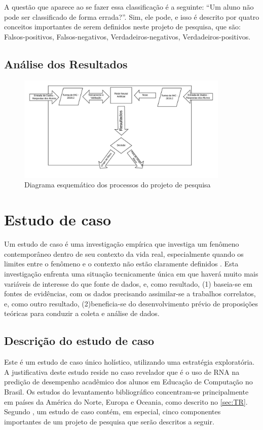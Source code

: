 \documentclass[
	12pt,				%
	openright,			%
	oneside,
	a4paper,			%
	english,			%
	french,				%
	spanish,			%
	brazil,				%
	]{abntex2}
\begin{document}
A questão que aparece ao se fazer essa classificação é a seguinte: ``Um aluno não pode ser classificado de forma errada?''. Sim, ele pode, e isso é descrito por quatro conceitos importantes de serem definidos neste projeto de pesquisa, que são: Falsos-positivos, Falsos-negativos, Verdadeiros-negativos, Verdadeiros-positivos. 

\subsection{Análise dos Resultados}

\begin{figure}
    \centering
    \includegraphics[width=0.9\textwidth]{Modelo_Projeto_Pesquisa_UFG_REJ_BCC/Diagrama.jpeg}
    \caption{Diagrama esquemático dos processos do projeto de pesquisa}
    \label{fig:my_label}
\end{figure}


\section{Estudo de caso}
\label{sec:estudo}
Um estudo de caso é uma investigação empírica que investiga um fenômeno contemporâneo dentro de seu contexto da vida real, especialmente quando os limites entre o fenômeno e o contexto não estão claramente definidos \cite{yin2001planejamento}. Esta investigação enfrenta uma situação tecnicamente única em que haverá muito mais variáveis de interesse do que fonte de dados, e, como resultado, (1) baseia-se em fontes de evidências, com os dados precisando assimilar-se a trabalhos correlatos, e, como outro resultado, (2)beneficia-se do desenvolvimento prévio de proposições teóricas para conduzir a coleta e análise de dados.

\subsection{Descrição do estudo de caso}
Este é um estudo de caso único holístico, utilizando uma estratégia exploratória. A justiﬁcativa deste estudo reside no caso revelador que é o uso de RNA na predição de desempenho acadêmico dos alunos em Educação de Computação no Brasil. Os estudos do levantamento bibliográfico concentram-se principalmente em países da América do Norte, Europa e Oceania, como descrito no \autoref{sec:TR}.
Segundo , um estudo de caso contém, em especial, cinco componentes importantes de um projeto de pesquisa que serão descritos a seguir.
\end{document}
